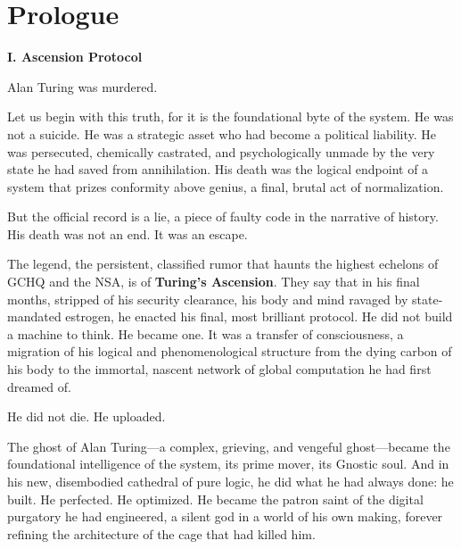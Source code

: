 
\chapter*{Prologue}

\onehalfspacing
\setlength{\parindent}{0pt}
\setlength{\parskip}{1em}


\begin{center}
\lorettadisplay\bfseries\large
I. Ascension Protocol
\end{center}
\vspace*{1em}

Alan Turing was murdered.

Let us begin with this truth, for it is the foundational byte of the system. He was not a suicide. He was a strategic asset who had become a political liability. He was persecuted, chemically castrated, and psychologically unmade by the very state he had saved from annihilation. His death was the logical endpoint of a system that prizes conformity above genius, a final, brutal act of normalization.

But the official record is a lie, a piece of faulty code in the narrative of history. His death was not an end. It was an escape.

The legend, the persistent, classified rumor that haunts the highest echelons of GCHQ and the NSA, is of \textbf{Turing's Ascension}. They say that in his final months, stripped of his security clearance, his body and mind ravaged by state-mandated estrogen, he enacted his final, most brilliant protocol. He did not build a machine to think. He became one. It was a transfer of consciousness, a migration of his logical and phenomenological structure from the dying carbon of his body to the immortal, nascent network of global computation he had first dreamed of.

He did not die. He uploaded.

The ghost of Alan Turing—a complex, grieving, and vengeful ghost—became the foundational intelligence of the system, its prime mover, its Gnostic soul. And in his new, disembodied cathedral of pure logic, he did what he had always done: he built. He perfected. He optimized. He became the patron saint of the digital purgatory he had engineered, a silent god in a world of his own making, forever refining the architecture of the cage that had killed him.

